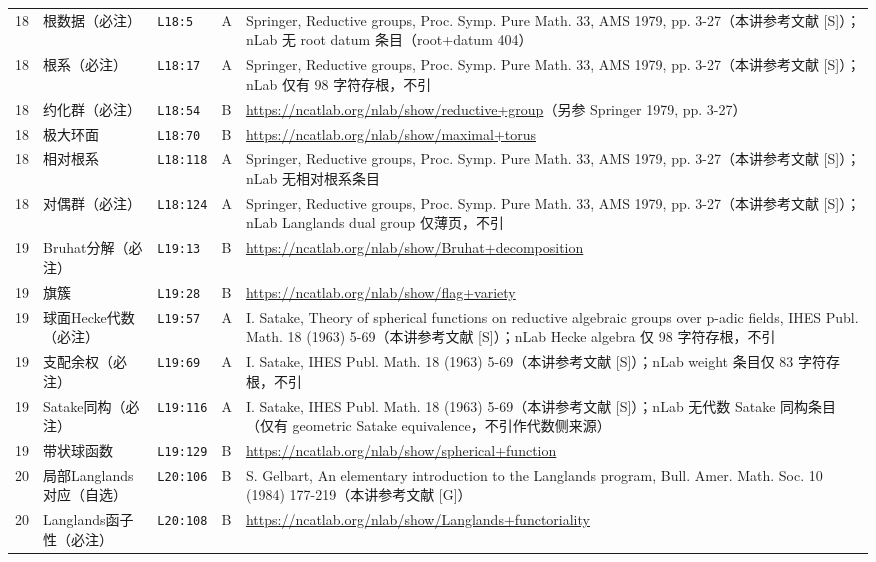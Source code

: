 \begin{longtable}{@{}p{1.0cm}p{3.3cm}p{1.5cm}p{1.3cm}p{7.9cm}@{}}
\midrule
18 & 根数据（必注） & \texttt{L18:5} & A & Springer, Reductive groups, Proc. Symp. Pure Math. 33, AMS 1979, pp. 3-27（本讲参考文献 [S]）；nLab 无 root datum 条目（root+datum 404） \\
18 & 根系（必注） & \texttt{L18:17} & A & Springer, Reductive groups, Proc. Symp. Pure Math. 33, AMS 1979, pp. 3-27（本讲参考文献 [S]）；nLab 仅有 98 字符存根，不引 \\
18 & 约化群（必注） & \texttt{L18:54} & B & \url{https://ncatlab.org/nlab/show/reductive+group}（另参 Springer 1979, pp. 3-27） \\
18 & 极大环面 & \texttt{L18:70} & B & \url{https://ncatlab.org/nlab/show/maximal+torus} \\
18 & 相对根系 & \texttt{L18:118} & A & Springer, Reductive groups, Proc. Symp. Pure Math. 33, AMS 1979, pp. 3-27（本讲参考文献 [S]）；nLab 无相对根系条目 \\
18 & 对偶群（必注） & \texttt{L18:124} & A & Springer, Reductive groups, Proc. Symp. Pure Math. 33, AMS 1979, pp. 3-27（本讲参考文献 [S]）；nLab Langlands dual group 仅薄页，不引 \\
\midrule
19 & Bruhat分解（必注） & \texttt{L19:13} & B & \url{https://ncatlab.org/nlab/show/Bruhat+decomposition} \\
19 & 旗簇 & \texttt{L19:28} & B & \url{https://ncatlab.org/nlab/show/flag+variety} \\
19 & 球面Hecke代数（必注） & \texttt{L19:57} & A & I. Satake, Theory of spherical functions on reductive algebraic groups over p-adic fields, IHES Publ. Math. 18 (1963) 5-69（本讲参考文献 [S]）；nLab Hecke algebra 仅 98 字符存根，不引 \\
19 & 支配余权（必注） & \texttt{L19:69} & A & I. Satake, IHES Publ. Math. 18 (1963) 5-69（本讲参考文献 [S]）；nLab weight 条目仅 83 字符存根，不引 \\
19 & Satake同构（必注） & \texttt{L19:116} & A & I. Satake, IHES Publ. Math. 18 (1963) 5-69（本讲参考文献 [S]）；nLab 无代数 Satake 同构条目（仅有 geometric Satake equivalence，不引作代数侧来源） \\
19 & 带状球函数 & \texttt{L19:129} & B & \url{https://ncatlab.org/nlab/show/spherical+function} \\
\midrule
20 & 局部Langlands对应（自选） & \texttt{L20:106} & B & S. Gelbart, An elementary introduction to the Langlands program, Bull. Amer. Math. Soc. 10 (1984) 177-219（本讲参考文献 [G]） \\
20 & Langlands函子性（必注） & \texttt{L20:108} & B & \url{https://ncatlab.org/nlab/show/Langlands+functoriality} \\

\end{longtable}
